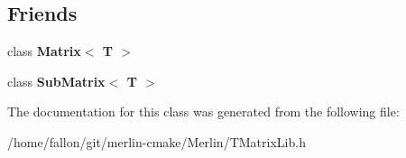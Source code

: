 \subsection*{Friends}
\begin{DoxyCompactItemize}
\item 
\mbox{\label{classTLAS_1_1ConstSubMatrix_a17fc06682c9f9c46f1e0e38b7af25b80}} 
class {\bfseries Matrix$<$ T $>$}
\item 
\mbox{\label{classTLAS_1_1ConstSubMatrix_a46c149b98c38cb0aa6399812693f1db0}} 
class {\bfseries Sub\+Matrix$<$ T $>$}
\end{DoxyCompactItemize}


The documentation for this class was generated from the following file\+:\begin{DoxyCompactItemize}
\item 
/home/fallon/git/merlin-\/cmake/\+Merlin/T\+Matrix\+Lib.\+h\end{DoxyCompactItemize}
